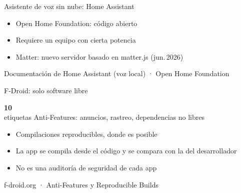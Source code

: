 \documentclass[aspectratio=169,12pt]{beamer}
\newcommand{\cifra}[2]{%
  \begin{center}
    {\color{terra}\fontsize{36}{40}\selectfont\bfseries #1}\\[0.2cm]
    {\large #2}
  \end{center}}
\newcommand{\fuente}[1]{\vfill{\small\color{gris}#1\par}}
\begin{document}
\begin{frame}{Asistente de voz sin nube: Home Assistant}
  \begin{center}
  \end{center}
  \vspace{0.2cm}
  \begin{itemize}
    \item Open Home Foundation: código abierto
    \item Requiere un equipo con cierta potencia
    \item Matter: nuevo servidor basado en matter.js (jun.\,2026)
  \end{itemize}
  \fuente{Documentación de Home Assistant (voz local) · Open Home Foundation}
\end{frame}

\begin{frame}{F-Droid: solo software libre}
  \cifra{10}{etiquetas Anti-Features: anuncios, rastreo, dependencias no libres}
  \begin{itemize}
    \item Compilaciones reproducibles, donde es posible
    \item La app se compila desde el código y se compara con la del desarrollador
    \item \alert{No es una auditoría de seguridad de cada app}
  \end{itemize}
  \fuente{f-droid.org · Anti-Features y Reproducible Builds}
\end{frame}
\end{document}
